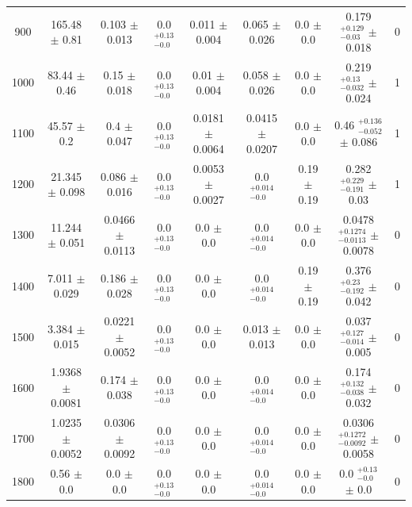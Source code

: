 \begin{table}[H]
\begin{center}
\begin{tabular}{ccccccccc}
            900  &      165.48 $\pm$ 0.81  &  	 0.103 $\pm$ 0.013  &           0.0 $ _{-0.0}^{+0.13}$   &  0.011 $\pm$ 0.004  &    0.065 $\pm$ 0.026  &        0.0 $\pm$ 0.0  &        0.179 $ _{-0.03}^{+0.129}$   $\pm$ 0.018  &         0 \\
            1000  &     83.44 $\pm$ 0.46  &   	 0.15 $\pm$ 0.018  &            0.0 $ _{-0.0}^{+0.13}$   &  0.01 $\pm$ 0.004  &     0.058 $\pm$ 0.026  &        0.0 $\pm$ 0.0  &        0.219 $ _{-0.032}^{+0.13}$   $\pm$ 0.024  &         1 \\
            1100  &     45.57 $\pm$ 0.2  &    	 0.4 $\pm$ 0.047  &             0.0 $ _{-0.0}^{+0.13}$   &  0.0181 $\pm$ 0.0064  &  0.0415 $\pm$ 0.0207  &      0.0 $\pm$ 0.0  &        0.46 $ _{-0.052}^{+0.136}$   $\pm$ 0.086  &         1 \\
            1200  &     21.345 $\pm$ 0.098  & 	 0.086 $\pm$ 0.016  &           0.0 $ _{-0.0}^{+0.13}$   &  0.0053 $\pm$ 0.0027  &  0.0 $ _{-0.0}^{+0.014}$   & 0.19 $\pm$ 0.19  &      0.282 $ _{-0.191}^{+0.229}$   $\pm$ 0.03  &         1 \\
            1300  &     11.244 $\pm$ 0.051  & 	 0.0466 $\pm$ 0.0113  &         0.0 $ _{-0.0}^{+0.13}$   &  0.0 $\pm$ 0.0  &        0.0 $ _{-0.0}^{+0.014}$   & 0.0 $\pm$ 0.0  &        0.0478 $ _{-0.0113}^{+0.1274}$   $\pm$ 0.0078  &    0 \\
            1400  &     7.011 $\pm$ 0.029  &  	 0.186 $\pm$ 0.028  &           0.0 $ _{-0.0}^{+0.13}$   &  0.0 $\pm$ 0.0  &        0.0 $ _{-0.0}^{+0.014}$   & 0.19 $\pm$ 0.19  &      0.376 $ _{-0.192}^{+0.23}$   $\pm$ 0.042  &         0 \\
            1500  &     3.384 $\pm$ 0.015  &  	 0.0221 $\pm$ 0.0052  &         0.0 $ _{-0.0}^{+0.13}$   &  0.0 $\pm$ 0.0  &        0.013 $\pm$ 0.013  &        0.0 $\pm$ 0.0  &        0.037 $ _{-0.014}^{+0.127}$   $\pm$ 0.005  &        0 \\
            1600  &     1.9368 $\pm$ 0.0081  &	 0.174 $\pm$ 0.038  &           0.0 $ _{-0.0}^{+0.13}$   &  0.0 $\pm$ 0.0  &        0.0 $ _{-0.0}^{+0.014}$   & 0.0 $\pm$ 0.0  &        0.174 $ _{-0.038}^{+0.132}$   $\pm$ 0.032  &        0 \\
            1700  &     1.0235 $\pm$ 0.0052  &	 0.0306 $\pm$ 0.0092  &         0.0 $ _{-0.0}^{+0.13}$   &  0.0 $\pm$ 0.0  &        0.0 $ _{-0.0}^{+0.014}$   & 0.0 $\pm$ 0.0  &        0.0306 $ _{-0.0092}^{+0.1272}$   $\pm$ 0.0058  &    0 \\
            1800  &     0.56 $\pm$ 0.0  &     	 0.0 $\pm$ 0.0  &               0.0 $ _{-0.0}^{+0.13}$   &  0.0 $\pm$ 0.0  &        0.0 $ _{-0.0}^{+0.014}$   & 0.0 $\pm$ 0.0  &        0.0 $ _{-0.0}^{+0.13}$   $\pm$ 0.0  &               0 \\

\end{tabular}
\end{center}
\end{table}
